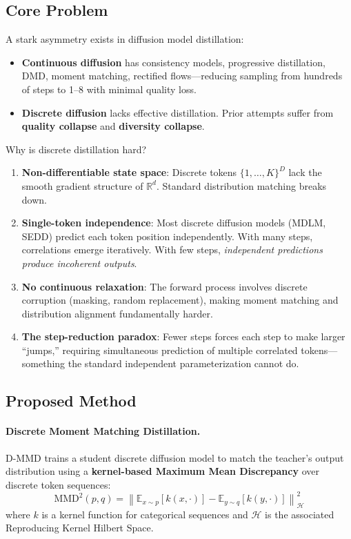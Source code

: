 \documentclass[11pt]{article}
\begin{document}
\subsection{Core Problem}

A stark asymmetry exists in diffusion model distillation:
\begin{itemize}
    \item \textbf{Continuous diffusion} has consistency models, progressive distillation, DMD, moment matching, rectified flows---reducing sampling from hundreds of steps to 1--8 with minimal quality loss.
    \item \textbf{Discrete diffusion} lacks effective distillation. Prior attempts suffer from \textbf{quality collapse} and \textbf{diversity collapse}.
\end{itemize}

Why is discrete distillation hard?
\begin{enumerate}
    \item \textbf{Non-differentiable state space}: Discrete tokens $\{1, \ldots, K\}^D$ lack the smooth gradient structure of $\mathbb{R}^d$. Standard distribution matching breaks down.
    \item \textbf{Single-token independence}: Most discrete diffusion models (MDLM, SEDD) predict each token position independently. With many steps, correlations emerge iteratively. With few steps, \emph{independent predictions produce incoherent outputs}.
    \item \textbf{No continuous relaxation}: The forward process involves discrete corruption (masking, random replacement), making moment matching and distribution alignment fundamentally harder.
    \item \textbf{The step-reduction paradox}: Fewer steps forces each step to make larger ``jumps,'' requiring simultaneous prediction of multiple correlated tokens---something the standard independent parameterization cannot do.
\end{enumerate}

\subsection{Proposed Method}

\paragraph{Discrete Moment Matching Distillation.}
D-MMD trains a student discrete diffusion model to match the teacher's output distribution using a \textbf{kernel-based Maximum Mean Discrepancy} over discrete token sequences:
\[
\mathrm{MMD}^2(p, q) = \left\| \mathbb{E}_{x \sim p}[k(x, \cdot)] - \mathbb{E}_{y \sim q}[k(y, \cdot)] \right\|_{\mathcal{H}}^2
\]
where $k$ is a kernel function for categorical sequences and $\mathcal{H}$ is the associated Reproducing Kernel Hilbert Space.
\end{document}

